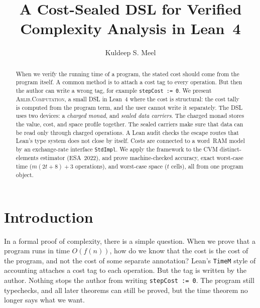 \documentclass[acmsmall,nonacm]{acmart}
\begin{document}
\title{A Cost-Sealed DSL for Verified Complexity Analysis in Lean~4}

\author{Kuldeep S. Meel}

\begin{abstract}
When we verify the running time of a program, the stated cost should come from the program itself.
A common method is to attach a cost tag to every operation.
But then the author can write a wrong tag, for example \lstinline{stepCost := 0}.
We present \textsc{Arlib.Computation}, a small DSL in Lean~4 where the cost is structural: the cost tally is computed from the program term, and the user cannot write it separately.
The DSL uses two devices: a \emph{charged monad}, and \emph{sealed data carriers}.
The charged monad stores the value, cost, and space profile together.
The sealed carriers make sure that data can be read only through charged operations.
A Lean audit checks the escape routes that Lean's type system does not close by itself.
Costs are connected to a word~RAM model by an exchange-rate interface \lstinline{StdImpl}.
We apply the framework to the CVM distinct-elements estimator (ESA~2022), and prove machine-checked accuracy, exact worst-case time ($m(2t+8)+3$ operations), and worst-case space ($t$ cells), all from one program object.
\end{abstract}

\maketitle

\section{Introduction}\label{sec:intro}

In a formal proof of complexity, there is a simple question.
When we prove that a program runs in time $O(f(n))$, how do we know that the cost is the cost of the program, and not the cost of some separate annotation?
Lean's \lstinline{TimeM} style of accounting attaches a cost tag to each operation.
But the tag is written by the author.
Nothing stops the author from writing \lstinline{stepCost := 0}.
The program still typechecks, and all later theorems can still be proved, but the time theorem no longer says what we want.
\end{document}
